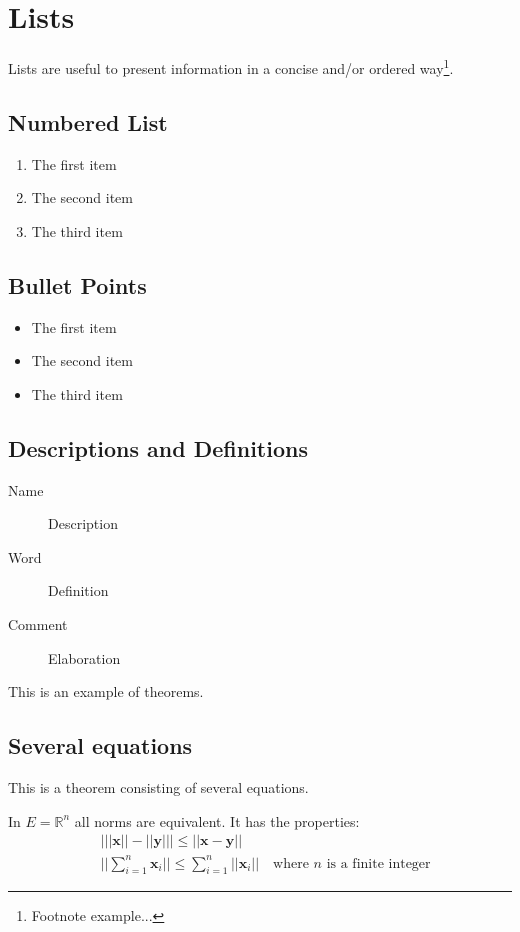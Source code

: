 \documentclass[11pt,fleqn]{book} %
\begin{document}
\section{Lists}

Lists are useful to present information in a concise and/or ordered way\footnote{Footnote example...}.

\subsection{Numbered List}

\begin{enumerate}
\item The first item
\item The second item
\item The third item
\end{enumerate}

\subsection{Bullet Points}

\begin{itemize}
\item The first item
\item The second item
\item The third item
\end{itemize}

\subsection{Descriptions and Definitions}

\begin{description}
\item[Name] Description
\item[Word] Definition
\item[Comment] Elaboration
\end{description}

This is an example of theorems.

\subsection{Several equations}
This is a theorem consisting of several equations.

\begin{theorem}
In $E=\mathbb{R}^n$ all norms are equivalent. It has the properties:
\begin{align}
& \big| ||\mathbf{x}|| - ||\mathbf{y}|| \big|\leq || \mathbf{x}- \mathbf{y}||\\
&  ||\sum_{i=1}^n\mathbf{x}_i||\leq \sum_{i=1}^n||\mathbf{x}_i||\quad\text{where $n$ is a finite integer}
\end{align}
\end{theorem}
\end{document}
